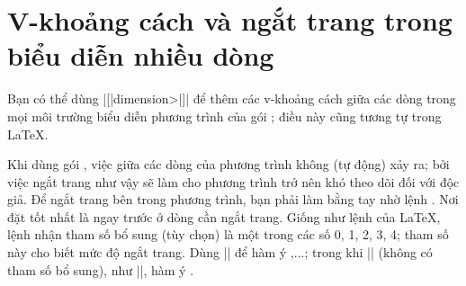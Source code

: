\section{V-khoảng cách và ngắt trang trong biểu diễn nhiều dòng}

Bạn có thể dùng \cn{\\}|[|\<dimension>|]| để thêm các v-khoảng cách giữa
các dòng trong mọi môi trường biểu diễn phương trình của gói ;
điều này cũng tương tự trong \LaTeX{}.


\medskip
Khi dùng gói , việc  giữa các dòng của phương trình
không (tự động) xảy ra; bởi việc ngắt trang như vậy sẽ làm cho phương trình trở nên
khó theo dõi đối với độc giả.
Để ngắt trang bên trong phương trình, bạn phải làm bằng tay nhờ lệnh
.
Nơi đặt  tốt nhất là ngay trước \cn{\\} ở dòng cần ngắt trang.
Giống như lệnh  của \LaTeX{}, lệnh  nhận
tham số bổ sung (tùy chọn) là một trong các số 0, 1, 2, 3, 4;
tham số này cho biết mức độ ngắt trang. Dùng |\displaybreak[0]| để hàm ý
,...; trong khi |\displaybreak|
(không có tham số bổ sung), như |\displaybreak[4]|, hàm ý
.

